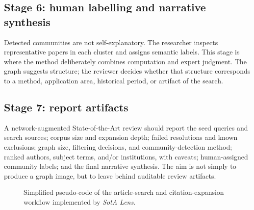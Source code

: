 \documentclass[11pt,a4paper]{article}
\newcommand{\tool}{\emph{SotA Lens}}
\newcommand{\sota}{State-of-the-Art}
\begin{document}
\subsection{Stage 6: human labelling and narrative synthesis}

Detected communities are not self-explanatory. The researcher inspects representative papers in each cluster and assigns semantic labels. This stage is where the method deliberately combines computation and expert judgment. The graph suggests structure; the reviewer decides whether that structure corresponds to a method, application area, historical period, or artifact of the search.

\subsection{Stage 7: report artifacts}

A network-augmented \sota{} review should report the seed queries and search sources; corpus size and expansion depth; failed resolutions and known exclusions; graph size, filtering decisions, and community-detection method; ranked authors, subject terms, and/or institutions, with caveats; human-assigned community labels; and the final narrative synthesis. The aim is not simply to produce a graph image, but to leave behind auditable review artifacts.

\begin{figure}[htbp]
\small
\centering
{}
\caption{Simplified pseudo-code of the article-search and citation-expansion workflow implemented by \tool{}.}
\label{fig:workflow}
\end{figure}
\end{document}
